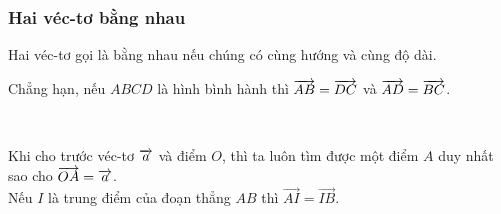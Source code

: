 \subsubsection{Hai véc-tơ bằng nhau}
\begin{dn}
Hai véc-tơ gọi là bằng nhau nếu chúng có cùng hướng và cùng độ dài.
\end{dn}
\begin{minipage}{0.55\textwidth}
Chẳng hạn, nếu $ABCD$ là hình bình hành thì $\protect\overrightarrow{AB}=\protect\overrightarrow{DC}$ và $\protect\overrightarrow{AD}=\protect\overrightarrow{BC}$.
\end{minipage}
\begin{minipage}{0.4\textwidth}
\end{minipage}\\
\begin{note}
Khi cho trước véc-tơ $\protect\overrightarrow{a}$ và điểm $O$, thì ta luôn tìm được một điểm $A$ duy nhất sao cho $\protect\overrightarrow{OA}=\protect\overrightarrow{a}$.\\
Nếu $I$ là trung điểm của đoạn thẳng $AB$ thì $\vec{AI}=\vec{IB}$.
\end{note}

